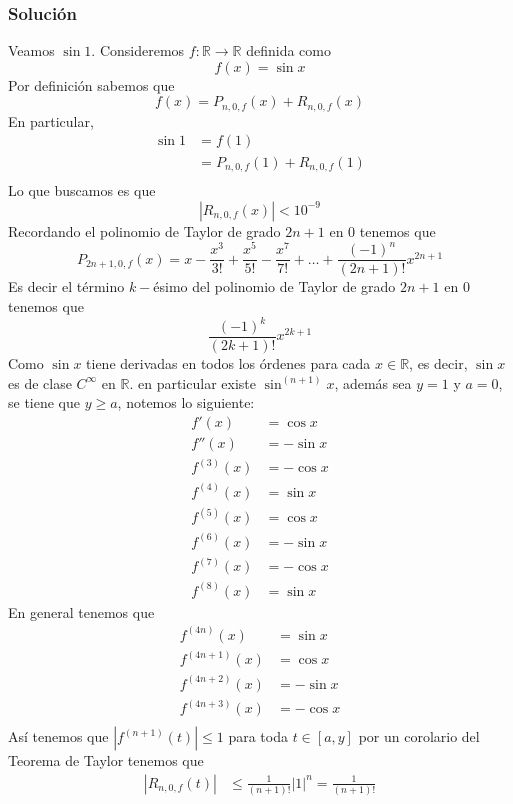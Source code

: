 \documentclass[a4paper]{article}
\begin{document}
\subsubsection*{Solución}
Veamos \(\sin{1}\).
\newline 
Consideremos \(f : \mathbb{R} \to \mathbb{R}\) definida como
\[
    f(x) = \sin{x}
\]
Por definición sabemos que 
\[
    f(x) = P_{n, 0, f}(x) + R_{n, 0, f}(x)
\]
En particular, 
\begin{align*}
    \sin{1} &= f(1) \\
    &= P_{n, 0, f}(1) + R_{n, 0, f}(1) \\
\end{align*}
Lo que buscamos es que 
\[
    | R_{n, 0, f}(x) | < 10^{-9}
\]
Recordando el polinomio de Taylor de grado \(2n + 1\) en \(0\) tenemos que
\[
    P_{2n + 1, 0, f}(x) = x - \frac{x^3}{3!} + \frac{x^5}{5!} - \frac{x^7}{7!} + \dotsc + \frac{(-1)^{n}}{(2n + 1)!}x^{2n + 1}
\]
Es decir el término \(k-\)ésimo del polinomio de Taylor de grado \(2n + 1\) en \(0\) tenemos que
\[
    \frac{(-1)^{k}}{(2k + 1)!}x^{2k + 1}
\]
Como \(\sin{x}\) tiene derivadas en todos los órdenes para cada 
\(x \in \mathbb{R}\), es decir, \(\sin{x}\) es de clase \(C^{\infty}\) en \(\mathbb{R}\).
en particular existe \(\sin^{(n+1)}{x}\), además sea \(y = 1\) y \(a = 0\), se tiene que 
\(y \geq a\), notemos lo siguiente:
\begin{align*}
    f'(x) &= \cos{x} \\
    f''(x) &= -\sin{x} \\
    f^{(3)}(x) &= -\cos{x} \\
    f^{(4)}(x) &= \sin{x} \\
    f^{(5)}(x) &=  \cos{x}  \\
    f^{(6)}(x) &= -\sin{x}  \\
    f^{(7)}(x) &= -\cos{x} \\
    f^{(8)}(x) &=  \sin{x} 
\end{align*}
En general tenemos que
\begin{align*}
    f^{(4n)}(x) &= \sin{x} \\
    f^{(4n + 1)}(x) &= \cos{x} \\
    f^{(4n + 2)}(x) &= -\sin{x} \\
    f^{(4n + 3)}(x) &= -\cos{x} \\
\end{align*}
Así tenemos que \(| f^{(n+1)}(t) | \leq 1\) para toda \(t \in [a, y]\) por un corolario del 
Teorema de Taylor tenemos que 
\begin{align*}
    | R_{n, 0, f}(t) | &\leq \frac{1}{(n + 1)!}|1|^{n} = \frac{1}{(n + 1)!}
\end{align*}
\end{document}

